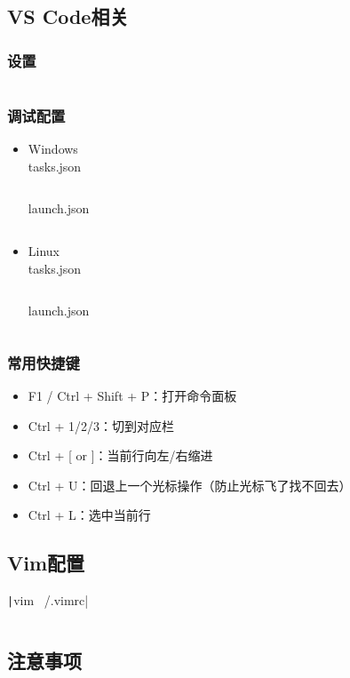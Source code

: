 \documentclass[a4paper, twoside]{article}
\begin{document}
\subsection{VS Code相关}
    \subsubsection{设置}
    \inputminted{json}{../src/附录/VSCode/settings.json}

    \subsubsection{调试配置}
    \begin{itemize}
        \item Windows\\
        tasks.json
        \inputminted{json}{../src/附录/VSCode/Windows-tasks.json}
        launch.json
        \inputminted{json}{../src/附录/VSCode/Windows-launch.json}
        \item Linux\\
        tasks.json
        \inputminted{json}{../src/附录/VSCode/Linux-tasks.json}
        launch.json
        \inputminted{json}{../src/附录/VSCode/Linux-launch.json}
    \end{itemize}

    \subsubsection{常用快捷键}
    \begin{itemize}
        \item F1 / Ctrl + Shift + P：打开命令面板
        \item Ctrl + 1/2/3：切到对应栏
        \item Ctrl + [ or ]：当前行向左/右缩进
        \item Ctrl + U：回退上一个光标操作（防止光标飞了找不回去）
        \item Ctrl + L：选中当前行
    \end{itemize}

\subsection{Vim配置}
\texttt|vim ~/.vimrc|
\inputminted{bash}{../src/附录/vim配置.sh}

\subsection{注意事项}
\end{document}
